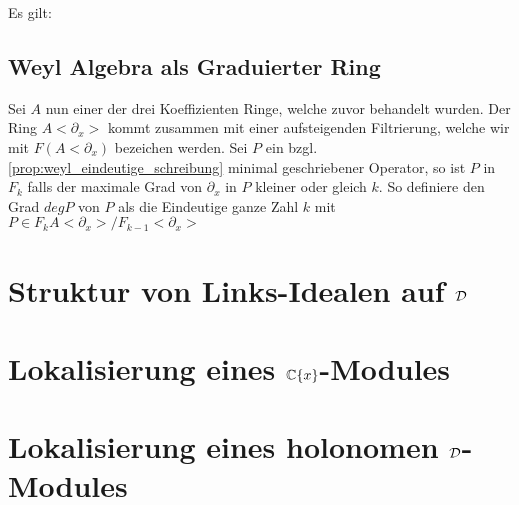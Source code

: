 \begin{prop}
  Es gilt:
  \begin{center}
  \end{center}
\end{prop}

\subsection{Weyl Algebra als Graduierter Ring}
Sei $A$ nun einer der drei Koeffizienten Ringe, welche zuvor behandelt wurden.
Der Ring $A<\partial_x>$ kommt zusammen mit einer aufsteigenden Filtrierung,
welche wir mit $F(A<\partial_x)$ bezeichen werden.
Sei $P$ ein bzgl. \ref{prop:weyl_eindeutige_schreibung} minimal geschriebener
Operator, so ist $P$ in $F_k$ falls der maximale Grad von $\partial_x$ in $P$
kleiner oder gleich $k$. So definiere den Grad $deg P$ von $P$ als die 
Eindeutige ganze Zahl $k$ mit $P\in F_kA<\partial_x>\slash F_{k-1}<\partial_x>$
\begin{comment}
  Unabhängigkeit von Schreibung wird in Sabbah Script behauptet
\end{comment}

\section{Struktur von Links-Idealen auf ${\mathcal{D}}$}

\section{Lokalisierung eines ${\mathbb C}\{x\}$-Modules} %

\section{Lokalisierung eines holonomen ${\mathcal{D}}$-Modules}

